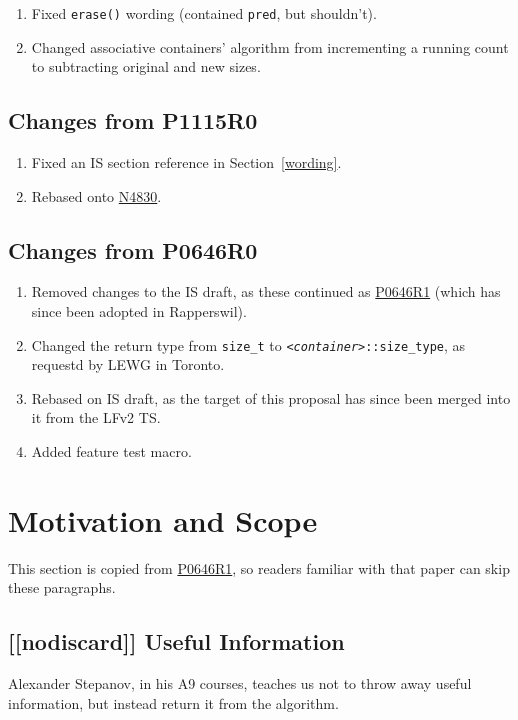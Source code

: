 \documentclass[11pt]{article}
\newcommand{\wgpaper}[1]{\href{https://wg21.link/#1}{#1}}
\newcommand{\cst}{\texttt{\textit{<container>}::size\_type}}
\begin{document}
\begin{enumerate}
\item Fixed \texttt{erase()} wording (contained \texttt{pred}, but shouldn't).
\item Changed associative containers' algorithm from incrementing a running count to subtracting original and new sizes.
\end{enumerate}

\subsection{Changes from P1115R0}

\begin{enumerate}
\item Fixed an IS section reference in Section~\ref{wording}.
\item Rebased onto \wgpaper{N4830}.
\end{enumerate}

\subsection{Changes from P0646R0}

\begin{enumerate}
\item Removed changes to the IS draft, as these continued as
  \wgpaper{P0646R1} (which has since been adopted in Rapperswil).
\item Changed the return type from \texttt{size\_t} to
  \cst, as requestd by LEWG in Toronto.
\item Rebased on IS draft, as the target of this proposal has since
  been merged into it from the LFv2 TS.
\item Added feature test macro.
\end{enumerate}

\section{Motivation and Scope}

This section is copied from \wgpaper{P0646R1}, so readers familiar
with that paper can skip these paragraphs.

\subsection{[[nodiscard]] Useful Information}

Alexander Stepanov, in his A9 courses\cite{A9}, teaches us not to
throw away useful information, but instead return it from the
algorithm.
\end{document}
